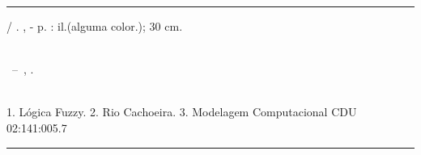 \begin{fichacatalografica}
\vspace*{15cm} %
\hrule %
\begin{center} %
\begin{minipage}[c]{12.5cm} %
\imprimirautor
\hspace{0.5cm} \imprimirtitulo / \imprimirautor. 
\imprimirlocal, \imprimirdata-
\hspace{0.5cm} \pageref{LastPage} p. : il.(alguma color.); 30 cm.\\
\hspace{0.5cm} \imprimirorientadorRotulo \; \imprimirorientador\\
\hspace{0.5cm}
\parbox[t]{\textwidth}{\imprimirtipotrabalho~--~\imprimirinstituicao,
\imprimirdata.}\\
\hspace{0.5cm}
1. Lógica Fuzzy.
2. Rio Cachoeira.
3. Modelagem Computacional
\hspace{8.75cm} CDU 02:141:005.7\\
\end{minipage}
\end{center}
\hrule
\end{fichacatalografica}